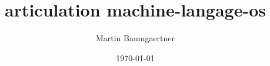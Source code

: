 \documentclass[11pt,a4paper,french]{article}
\begin{document}

		

             

\title{articulation machine-langage-os}

\author{
	Martin Baumgaertner
}



\date{\today}

\IMTAfrontcover
\pagestyle{IMTAfancy} %

\IMTAsommaire
\newpage
\IMTAlistefigures  %
\IMTAlistetableaux   %
\newpage
%
\end{document}
